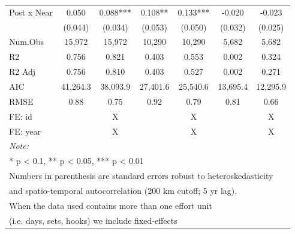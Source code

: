 \begin{table}
\begin{tabular}[t]{lcccccc}
\hline
\hspace{1em}Post x Near & 0.050 & 0.088*** & 0.108** & 0.133*** & -0.020 & -0.023\\
\hspace{1em} & (0.044) & (0.034) & (0.053) & (0.050) & (0.032) & (0.025)\\
\hspace{1em}Num.Obs & 15,972 & 15,972 & 10,290 & 10,290 & 5,682 & 5,682\\
\hspace{1em}R2 & 0.756 & 0.821 & 0.403 & 0.553 & 0.002 & 0.324\\
\hspace{1em}R2 Adj & 0.756 & 0.810 & 0.403 & 0.527 & 0.002 & 0.271\\
\hspace{1em}AIC & 41,264.3 & 38,093.9 & 27,401.6 & 25,540.6 & 13,695.4 & 12,295.9\\
\hspace{1em}RMSE & 0.88 & 0.75 & 0.92 & 0.79 & 0.81 & 0.66\\
\midrule
FE: id &  & X &  & X &  & X\\
FE: year &  & X &  & X &  & X\\
\midrule
\bottomrule
\multicolumn{7}{l}{\rule{0pt}{1em}\textit{Note: }}\\
\multicolumn{7}{l}{\rule{0pt}{1em}* p < 0.1, ** p < 0.05, *** p < 0.01}\\
\multicolumn{7}{l}{\rule{0pt}{1em}Numbers in parenthesis are standard errors robust to heteroskedasticity}\\
\multicolumn{7}{l}{\rule{0pt}{1em}and spatio-temporal autocorrelation (200 km cutoff; 5 yr lag).}\\
\multicolumn{7}{l}{\rule{0pt}{1em}When the data used contains more than one effort unit}\\
\multicolumn{7}{l}{\rule{0pt}{1em}(i.e. days, sets, hooks) we include fixed-effects}\\
\end{tabular}
\end{table}